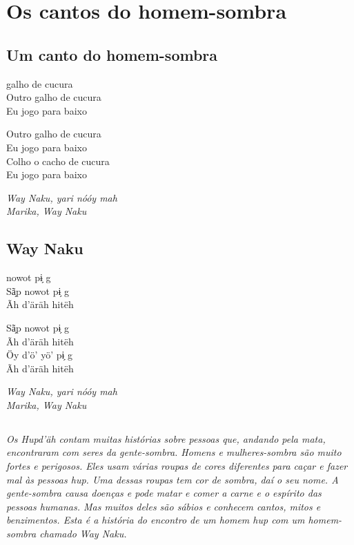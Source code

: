 \part{Os cantos do homem-sombra}

\openany

{\pagecolor{black}
\color{white}
\chapter*{Um canto do homem-sombra}

 galho de cucura\\
Outro galho de cucura\\
Eu jogo para baixo

\bigskip

\noindent Outro galho de cucura\\
Eu jogo para baixo\\
Colho o cacho de cucura\\
Eu jogo para baixo

\bigskip

\noindent \textit{Way Naku, yari nóóy mah\\
Marika, Way Naku}

\chapter*{Way Naku}

 nowot pɨ̗ g\\
Sã̗p nowot pɨ̗ g\\
Ãh d’äräh hitëh

\bigskip

\noindent Sã̗p nowot pɨ̗ g\\
Ãh d’äräh hitëh\\
Öy d’ö’ yö’ pɨ̗ g\\
Ãh d’äräh hitëh

\bigskip

\noindent \textit{Way Naku, yari nóóy mah\\
Marika, Way Naku}
\afterpage{\nopagecolor}}

\chapter*{}
\thispagestyle{empty}

\vspace*{\fill}
\textit{Os Hupd'äh contam muitas histórias sobre pessoas que, andando pela mata, encontraram com seres da gente-sombra. Homens e mulheres-sombra são muito fortes e perigosos. Eles usam várias roupas de cores diferentes para caçar e fazer mal às pessoas hup. Uma dessas roupas tem cor de sombra, daí o seu nome. A gente-sombra causa doenças e pode matar e comer a carne e o espírito das pessoas humanas. Mas muitos deles são sábios e conhecem cantos, mitos e benzimentos. Esta é a história do encontro de um homem hup com um homem-sombra chamado Way Naku.}
\vspace*{\fill}


